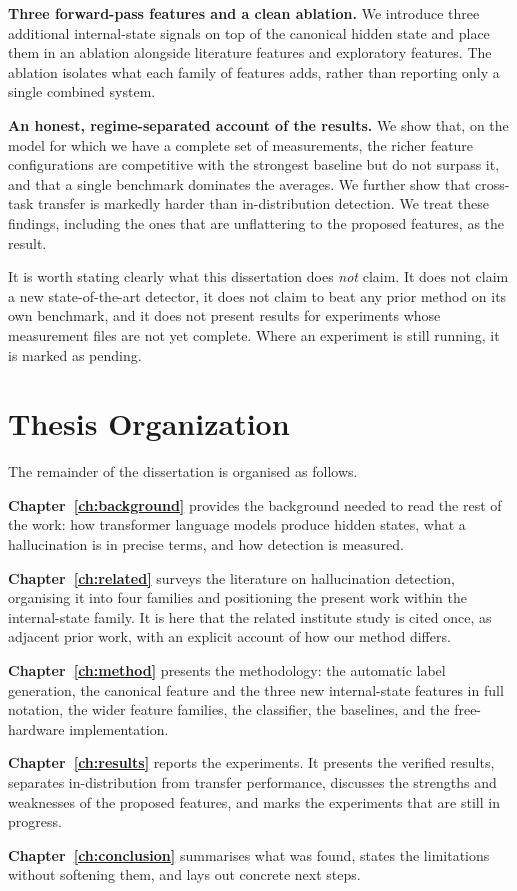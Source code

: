 \textbf{Three forward-pass features and a clean ablation.} We introduce three
additional internal-state signals on top of the canonical hidden state and place them
in an ablation alongside literature features and exploratory features. The ablation
isolates what each family of features adds, rather than reporting only a single combined
system.

\textbf{An honest, regime-separated account of the results.} We show that, on the model
for which we have a complete set of measurements, the richer feature configurations are
competitive with the strongest baseline but do not surpass it, and that a single
benchmark dominates the averages. We further show that cross-task transfer is markedly
harder than in-distribution detection. We treat these findings, including the ones that
are unflattering to the proposed features, as the result.

It is worth stating clearly what this dissertation does \emph{not} claim. It does not
claim a new state-of-the-art detector, it does not claim to beat any prior method on its
own benchmark, and it does not present results for experiments whose measurement files
are not yet complete. Where an experiment is still running, it is marked as pending.

\section{Thesis Organization}

The remainder of the dissertation is organised as follows.

\textbf{Chapter~\ref{ch:background}} provides the background needed to read the rest of
the work: how transformer language models produce hidden states, what a hallucination is
in precise terms, and how detection is measured.

\textbf{Chapter~\ref{ch:related}} surveys the literature on hallucination detection,
organising it into four families and positioning the present work within the
internal-state family. It is here that the related institute study is cited once, as
adjacent prior work, with an explicit account of how our method differs.

\textbf{Chapter~\ref{ch:method}} presents the methodology: the automatic label
generation, the canonical feature and the three new internal-state features in full
notation, the wider feature families, the classifier, the baselines, and the
free-hardware implementation.

\textbf{Chapter~\ref{ch:results}} reports the experiments. It presents the verified
results, separates in-distribution from transfer performance, discusses the strengths
and weaknesses of the proposed features, and marks the experiments that are still in
progress.

\textbf{Chapter~\ref{ch:conclusion}} summarises what was found, states the limitations
without softening them, and lays out concrete next steps.
